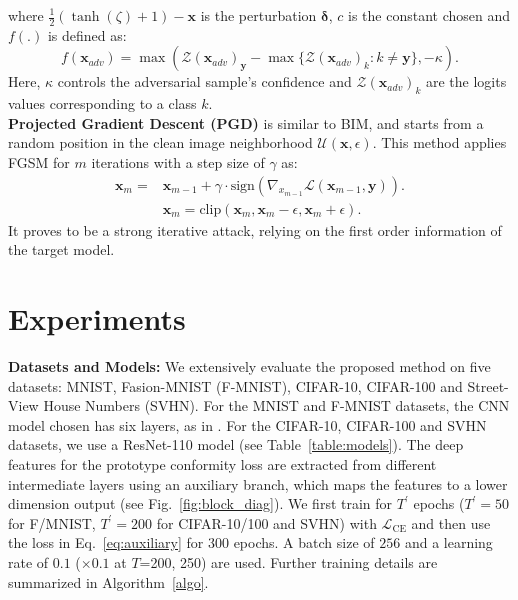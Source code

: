 \documentclass[10pt,twocolumn,letterpaper]{article}
\newcommand{\bx}{{\bm x}}
\newcommand{\bdelta}{{\bm \delta}}
\begin{document}
where $ \frac{1}{2}(\tanh{(\zeta)}+1) - \bm{x} $ is the perturbation $\bdelta$, $c$ is the constant chosen and $f(.)$ is defined as:
\vspace{-0.25em}
\begin{equation}
f(\bm{x}_{adv})= \max(\mathcal{Z}(\bm{x}_{adv})_{\bm{y}} - \max \{\mathcal{Z}(\bm{x}_{adv})_k : k \neq \bm{y} \}, -\kappa).
\end{equation}
Here, $\kappa$ controls the adversarial sample's confidence and $\mathcal{Z}(\bm{x}_{adv})_k$ are the logits values corresponding to a class $k$.\medskip \\
\textbf{Projected Gradient Descent (PGD)} \cite{madry2017towards} is similar to BIM, and starts from a random position in the clean image neighborhood $\mathcal{U}(\bx, \epsilon)$. This method applies FGSM for $m$ iterations with a step size of $\gamma$ as:
\vspace{-0.57em}
\begin{align}
    \bm{x}_{m} = & \bm{x}_{m-1} + \gamma \cdot \text{sign}(\nabla_{x_{m-1}} \mathcal{L}(\bx_{m-1},\bm{y})). \\
    & \bm{x}_{m} = \text{clip}(\bm{x}_{m}, \bm{x}_{m}-\epsilon, \bm{x}_{m} + \epsilon). 
\end{align}
It proves to be a strong iterative attack, relying on the first order information of the target model.

\vspace{-0.25em}
\section{Experiments}
\label{sec:experiments}
\vspace{-0.25em}
\noindent \textbf{Datasets and Models:} We extensively evaluate the proposed method on five datasets: MNIST, Fasion-MNIST (F-MNIST), CIFAR-10, CIFAR-100 and Street-View House Numbers (SVHN). For the MNIST and F-MNIST datasets, the CNN model chosen has six layers, as in \cite{wen2016discriminative}. For the CIFAR-10, CIFAR-100 and SVHN datasets, we use a ResNet-110 model \cite{he2016deep} (see Table~\ref{table:models}). The deep features for the prototype conformity loss are extracted from different intermediate layers using an auxiliary branch, which maps the features to a lower dimension output (see Fig.~\ref{fig:block_diag}). We first train for $T^{'}$ epochs ($T^{'}=50$ for F/MNIST, $T^{'}=200$ for CIFAR-10/100 and SVHN) with $\mathcal{L}_\text{CE}$ and then use the loss in Eq.~\ref{eq:auxiliary} for 300 epochs. A batch size of $256$ and a learning rate of $0.1$ ($\times 0.1$ at $T$=200, 250) are used. Further training details are summarized in Algorithm~\ref{algo}.
\end{document}
